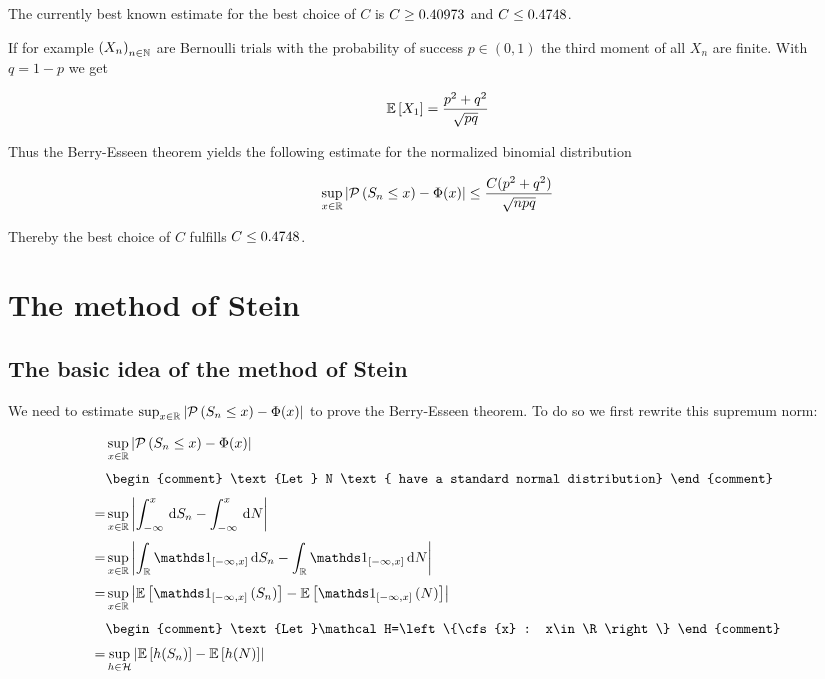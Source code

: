 \begin{remark}
  The currently best known estimate for the best choice of $C$ is $C \ge 0.40973$\cite{esseen1956} and $C \le 0.4748$\cite{shevtsova2011}.
\end{remark}

\begin{remark}
  If for example $\left({X_n}\right)_{{n}\in\mathbb N}$ are Bernoulli trials with the probability of success $p \in (0,1)$ the third moment of all $X_n$ are finite. With $q=1-p$ we get 

\begin{align}
  \mathbb E\left[{X_1}\right]=\frac{p^2+q^2}{\sqrt{pq}}
\end{align}

Thus the Berry-Esseen theorem yields the following estimate for the normalized binomial distribution

\begin{align}
  \sup_{x\in\mathbb R} \left|{\mathcal P\left({S_n\le x}\right)-\Phi(x)}\right| \le \frac{C(p^2+q^2)}{\sqrt{npq}}
\end{align}

\noindent Thereby the best choice of $C$ fulfills $C \le 0.4748$.
\end{remark}

\section{The method of Stein}

\subsection{The basic idea of the method of Stein}

We need to estimate $\sup_{x\in\mathbb R} \left|{\mathcal P\left({S_n\le x}\right)-\Phi(x)}\right|$ to prove the Berry-Esseen theorem. To do so we first rewrite this supremum norm:

\begin{align}
   & \sup_{x\in\R} \abs{\P{S_n\le x}-\Phi(x)} \nl
   &
   \begin{comment}
     \text{Let } N \text{ have a standard normal distribution}
   \end{comment} \nl
  =& \sup_{x\in\R} \abs{\int_{-\infty}^x \d{S_n} - \int_{-\infty}^x \d{N}} \nl
  =& \sup_{x\in\R} \abs{\int_{\R} \cfs{x} \d{S_n} - \int_{\R} \cfs{x} \d{N}} \nl
  =& \sup_{x\in\R} \abs{\E{\cf{x}{S_n}} - \E{\cf{x}{N}}} \nl
   &
   \begin{comment}
     \text{Let }\mathcal H=\left\{\cfs{x} : x\in\R\right\}
   \end{comment} \nl
  =& \sup_{h\in\mathcal H} \abs{\E{h(S_n)}-\E{h(N)}}
\end{align}

